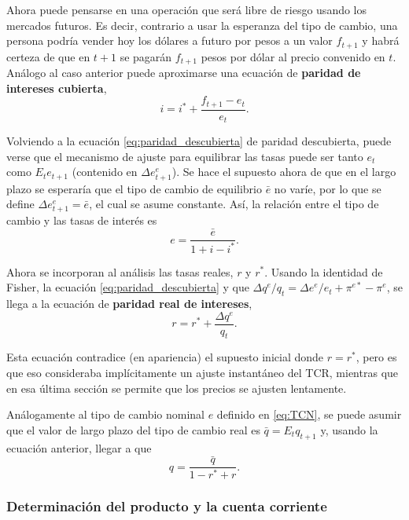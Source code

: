 \documentclass[DeGregorioResumen]{subfiles}
\begin{document}
Ahora puede pensarse en una operación que será libre de riesgo usando los mercados futuros. Es decir, contrario a usar la esperanza del tipo de cambio, una persona podría vender hoy los dólares a futuro por pesos a un valor $f_{t+1}$ y habrá certeza de que en $t+1$ se pagarán $f_{t+1}$ pesos por dólar al precio convenido en $t$. Análogo al caso anterior puede aproximarse una ecuación de \textbf{paridad de intereses cubierta},
\begin{equation}
	i = i^* + \frac{f_{t+1}-e_t}{e_t}.
\end{equation}

Volviendo a la ecuación \eqref{eq:paridad_descubierta} de paridad descubierta, puede verse que el mecanismo de ajuste para equilibrar las tasas puede ser tanto $e_t$ como $E_t e_{t+1}$ (contenido en $\Delta e^e_{t+1}$). Se hace el supuesto ahora de que en el largo plazo se esperaría que el tipo de cambio de equilibrio $\bar e$ no varíe, por lo que se define $\Delta e^e_{t+1}=\bar e$, el cual se asume constante. Así, la relación entre el tipo de cambio y las tasas de interés es
\begin{equation}
	e = \frac{\bar e}{1+i-i^*}.
	\label{eq:TCN}
\end{equation}

Ahora se incorporan al análisis las tasas reales, $r$ y $r^*$. Usando la identidad de Fisher, la ecuación \eqref{eq:paridad_descubierta} y que $\Delta q^e / q_t = \Delta e^e/e_t + \pi^{e*}-\pi^e$, se llega a la ecuación de \textbf{paridad real de intereses},
\begin{equation}
	r = r^* + \frac{\Delta q^e}{q_t}.
\end{equation}

Esta ecuación contradice (en apariencia) el supuesto inicial donde $r=r^*$, pero es que eso consideraba implícitamente un ajuste instantáneo del TCR, mientras que en esa última sección se permite que los precios se ajusten lentamente.

Análogamente al tipo de cambio nominal $e$ definido en \eqref{eq:TCN}, se puede asumir que el valor de largo plazo del tipo de cambio real es $\bar q = E_tq_{t+1}$ y, usando la ecuación anterior, llegar a que
\begin{equation}
	q = \frac{\bar q}{1-r^*+r}.
\end{equation}

\subsubsection{Determinación del producto y la cuenta corriente}
\end{document}
